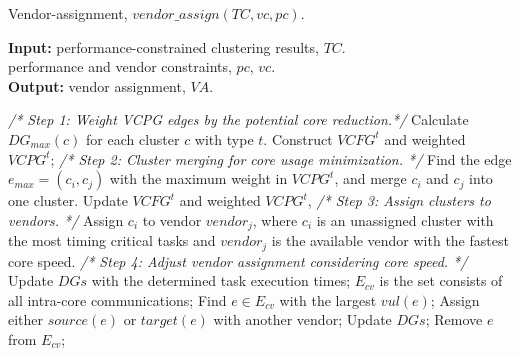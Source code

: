 \documentclass[10pt,journal, compsoc]{IEEEtran}
\begin{document}
\begin{algorithm}[!h]
\caption{Vendor-assignment, $vendor\_assign(TC, vc, pc)$.}
\label{alg:VA}
{\textbf{Input:}}
performance-constrained clustering results, $TC$.\\
\hspace*{2.4em} performance and vendor constraints, $pc$, $vc$.\\
{\textbf{Output:}} vendor assignment, $VA$.
\begin{algorithmic}[1]
\STATEx \hspace*{-\algorithmicindent}\textit{/* Step 1: Weight VCPG edges by the potential core reduction.*/}
\STATE Calculate $DG_{max}(c)$ for each cluster $c$ with type $t$.
\STATE Construct $VCFG^t$ and weighted $VCPG^t$;
\STATEx \hspace*{-\algorithmicindent}\textit{/* Step 2: Cluster merging for core usage minimization. */}
\STATE Find the edge $e_{max}=(c_i,c_j)$ with the maximum weight in $VCPG^t$, and merge $c_i$ and $c_j$ into one cluster.
\STATE Update $VCFG^t$ and weighted $VCPG^t$,
\ENDWHILE
\STATEx \hspace*{-\algorithmicindent}\textit{/* Step 3: Assign clusters to vendors. */}
    \STATE Assign $c_i$ to vendor $vendor_j$, where $c_i$ is an unassigned cluster with the most timing critical tasks and $vendor_j$ is the available vendor with the fastest core speed.
\ENDWHILE
\ENDFOR
\STATEx \hspace*{-\algorithmicindent}\textit{/* Step 4: Adjust vendor assignment considering core speed. */}
\STATE Update $DGs$ with the determined task execution times;
\STATE $E_{cv}$ is the set consists of all intra-core communications;
\STATE Find $e\in E_{cv}$ with the largest $vul(e)$;
\STATE Assign either $source(e)$ or $target(e)$ with another vendor;
\STATE Update $DGs$;
\ENDIF
\STATE Remove $e$ from $E_{cv}$;
\ENDWHILE
\end{algorithmic}
\end{algorithm}
\end{document}
